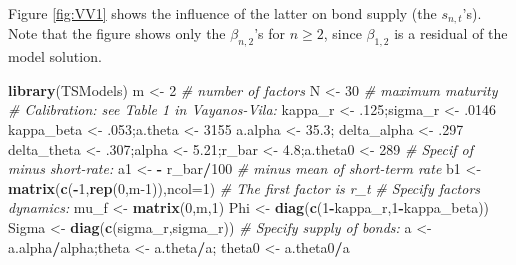 \documentclass[
  12pt,
]{book}
\newenvironment{Shaded}{\begin{snugshade}}{\end{snugshade}}
\newcommand{\AttributeTok}[1]{\textcolor[rgb]{0.13,0.29,0.53}{#1}}
\newcommand{\CommentTok}[1]{\textcolor[rgb]{0.56,0.35,0.01}{\textit{#1}}}
\newcommand{\DecValTok}[1]{\textcolor[rgb]{0.00,0.00,0.81}{#1}}
\newcommand{\FloatTok}[1]{\textcolor[rgb]{0.00,0.00,0.81}{#1}}
\newcommand{\FunctionTok}[1]{\textcolor[rgb]{0.13,0.29,0.53}{\textbf{#1}}}
\newcommand{\NormalTok}[1]{#1}
\newcommand{\OtherTok}[1]{\textcolor[rgb]{0.56,0.35,0.01}{#1}}
\newcommand{\SpecialCharTok}[1]{\textcolor[rgb]{0.81,0.36,0.00}{\textbf{#1}}}
\theoremstyle{definition}
\theoremstyle{definition}
\theoremstyle{definition}
\theoremstyle{definition}
\theoremstyle{remark}
\begin{document}
Figure \ref{fig:VV1} shows the influence of the latter on bond supply (the \(s_{n,t}\)'s). Note that the figure shows only the \(\beta_{n,2}\)'s for \(n \ge 2\), since \(\beta_{1,2}\) is a residual of the model solution.

\begin{Shaded}
\begin{Highlighting}[]
\FunctionTok{library}\NormalTok{(TSModels)}
\NormalTok{m }\OtherTok{\textless{}{-}} \DecValTok{2} \CommentTok{\# number of factors}
\NormalTok{N }\OtherTok{\textless{}{-}} \DecValTok{30} \CommentTok{\# maximum maturity}
\CommentTok{\# Calibration: see Table 1 in Vayanos{-}Vila:}
\NormalTok{kappa\_r }\OtherTok{\textless{}{-}}\NormalTok{ .}\DecValTok{125}\NormalTok{;sigma\_r }\OtherTok{\textless{}{-}}\NormalTok{ .}\DecValTok{0146}
\NormalTok{kappa\_beta }\OtherTok{\textless{}{-}}\NormalTok{ .}\DecValTok{053}\NormalTok{;a.theta }\OtherTok{\textless{}{-}} \DecValTok{3155}
\NormalTok{a.alpha }\OtherTok{\textless{}{-}} \FloatTok{35.3}\NormalTok{; delta\_alpha }\OtherTok{\textless{}{-}}\NormalTok{ .}\DecValTok{297}
\NormalTok{delta\_theta }\OtherTok{\textless{}{-}}\NormalTok{ .}\DecValTok{307}\NormalTok{;alpha }\OtherTok{\textless{}{-}} \FloatTok{5.21}\NormalTok{;r\_bar }\OtherTok{\textless{}{-}} \FloatTok{4.8}\NormalTok{;a.theta0 }\OtherTok{\textless{}{-}} \DecValTok{289}
\CommentTok{\# Specif of minus short{-}rate:}
\NormalTok{a1 }\OtherTok{\textless{}{-}} \SpecialCharTok{{-}}\NormalTok{ r\_bar}\SpecialCharTok{/}\DecValTok{100} \CommentTok{\# minus mean of short{-}term rate}
\NormalTok{b1 }\OtherTok{\textless{}{-}} \FunctionTok{matrix}\NormalTok{(}\FunctionTok{c}\NormalTok{(}\SpecialCharTok{{-}}\DecValTok{1}\NormalTok{,}\FunctionTok{rep}\NormalTok{(}\DecValTok{0}\NormalTok{,m}\DecValTok{{-}1}\NormalTok{)),}\AttributeTok{ncol=}\DecValTok{1}\NormalTok{) }\CommentTok{\# The first factor is r\_t}
\CommentTok{\# Specify factors\textquotesingle{} dynamics:}
\NormalTok{mu\_f  }\OtherTok{\textless{}{-}} \FunctionTok{matrix}\NormalTok{(}\DecValTok{0}\NormalTok{,m,}\DecValTok{1}\NormalTok{)}
\NormalTok{Phi   }\OtherTok{\textless{}{-}} \FunctionTok{diag}\NormalTok{(}\FunctionTok{c}\NormalTok{(}\DecValTok{1}\SpecialCharTok{{-}}\NormalTok{kappa\_r,}\DecValTok{1}\SpecialCharTok{{-}}\NormalTok{kappa\_beta))}
\NormalTok{Sigma }\OtherTok{\textless{}{-}} \FunctionTok{diag}\NormalTok{(}\FunctionTok{c}\NormalTok{(sigma\_r,sigma\_r))}
\CommentTok{\# Specify supply of bonds:}
\NormalTok{a }\OtherTok{\textless{}{-}}\NormalTok{ a.alpha}\SpecialCharTok{/}\NormalTok{alpha;theta }\OtherTok{\textless{}{-}}\NormalTok{ a.theta}\SpecialCharTok{/}\NormalTok{a; theta0 }\OtherTok{\textless{}{-}}\NormalTok{ a.theta0}\SpecialCharTok{/}\NormalTok{a}

\end{Highlighting}
\end{Shaded}
\end{document}

